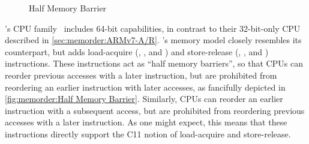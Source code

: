 \begin{figure}[tb]
\centering
{}
\caption{Half Memory Barrier}
\end{figure}

\ARM's  CPU family~\cite{ARMv8A:2017}
includes 64-bit capabilities,
in contrast to their 32-bit-only CPU described in
\cref{sec:memorder:ARMv7-A/R}.
's memory model closely resembles its  counterpart,
but adds load-acquire (, , and )
and store-release (, , and )
instructions.
These instructions act as ``half memory barriers'', so that
 CPUs can reorder previous accesses with a later 
instruction, but are prohibited from reordering an earlier 
instruction with later accesses, as fancifully depicted in
\cref{fig:memorder:Half Memory Barrier}.
Similarly,  CPUs can reorder an earlier  instruction with
a subsequent access, but are prohibited from reordering
previous accesses with a later  instruction.
As one might expect, this means that these instructions directly support
the C11 notion of load-acquire and store-release.

